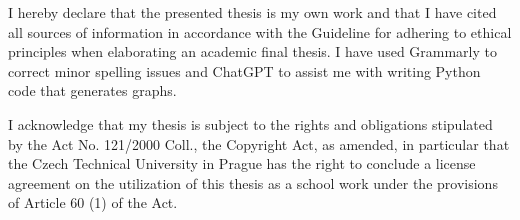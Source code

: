 \documentclass[english,master,unicode]{ctufit-thesis}
\theoremstyle{plain}
\theoremstyle{definition}
\theoremstyle{remark}
\numberwithin{theorem}{chapter}
\begin{document}
    \begin{declarationpage}
        I hereby declare that the presented thesis is my own work and that I have cited all
        sources of information in accordance with the Guideline for adhering to ethical
        principles when elaborating an academic final thesis.
        I have used Grammarly to correct minor spelling issues and ChatGPT to assist me with writing Python code that generates graphs.

        I acknowledge that my thesis is subject to the rights and obligations stipulated by the
        Act No. 121/2000 Coll., the Copyright Act, as amended, in particular that the Czech
        Technical University in Prague has the right to conclude a license agreement on the
        utilization of this thesis as a school work under the provisions of Article 60 (1) of the
        Act.
    \end{declarationpage}

    \printabstractpage %

%
%
%
%
%
%
%
%
%
\end{document}
